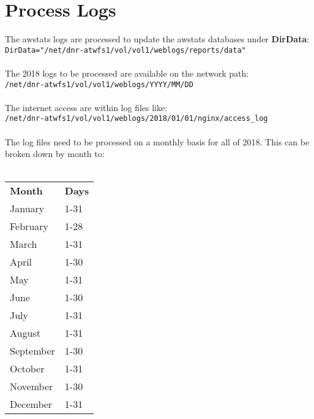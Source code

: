 
\newpage
\section{Process Logs}
The awstats logs are processed to update the awstats databases
under \textbf{DirData}:\\
\indent\texttt{DirData="/net/dnr-atwfs1/vol/vol1/weblogs/reports/data"}\\
\\
The 2018 logs to be processed are available on the network path:\\
\indent\texttt{/net/dnr-atwfs1/vol/vol1/weblogs/YYYY/MM/DD}\\
\\
The internet access are within log files like:\\
\indent\texttt{/net/dnr-atwfs1/vol/vol1/weblogs/2018/01/01/nginx/access\_log}\\
\\
The log files need to be processed on a monthly basis for all of
2018. This can be broken down by month to:\\
\\
\noindent\begin{tabular}{ l l }
\bf{Month}    & \bf{Days}\\
January  & 1-31\\
February & 1-28\\
March    & 1-31\\
April    & 1-30\\
May      & 1-31\\
June     & 1-30\\
July     & 1-31\\
August   & 1-31\\
September & 1-30\\
October   & 1-31\\
November   & 1-30\\
December   & 1-31\\
\end{tabular}


